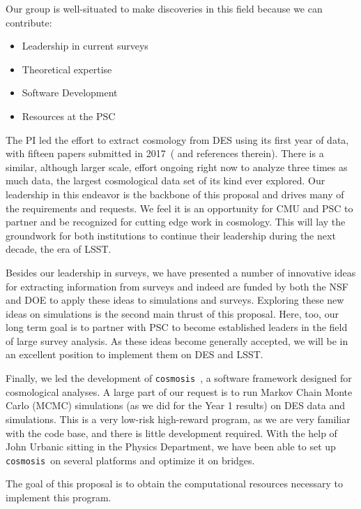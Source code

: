 \documentclass[12pt]{article}
\begin{document}
\begin{small}
Our group is well-situated to make discoveries in this field because we can contribute:
\begin{itemize}
\item Leadership in current surveys
\item Theoretical expertise
\item Software Development
\item Resources at the PSC
\end{itemize} 
The PI led the effort to extract cosmology from DES using its first year of data, with fifteen papers submitted in 2017~(\cite{Abbott:2017wau} and references therein). There is a similar, although larger scale, effort ongoing right now to analyze three times as much data, the largest cosmological data set of its kind ever explored. Our leadership in this endeavor is the backbone of this proposal and drives many of the requirements and requests. We feel it is an opportunity for CMU and PSC to partner and be recognized for cutting edge work in cosmology. This will lay the groundwork for both institutions to continue their leadership during the next decade, the era of LSST.

Besides our leadership in surveys, we have presented a number of innovative ideas for extracting information from surveys and indeed are funded by both the NSF and DOE to apply these ideas to simulations and surveys. Exploring these new ideas on simulations is the second main thrust of this proposal. Here, too, our long term goal is to partner with PSC to become established leaders in the field of large survey analysis. As these ideas become generally accepted, we will be in an excellent position to implement them on DES and LSST.
\newcommand\cosmosis{{\tt cosmosis}}

Finally, we led the development of {\tt cosmosis}~\cite{Zuntz:2014csq}, a software framework designed for cosmological analyses. A large part of our request is to run Markov Chain Monte Carlo (MCMC) simulations (as we did for the Year 1 results) on DES data and simulations. This is a very low-risk high-reward program, as we are very familiar with the code base, and there is little development required. With the help of John Urbanic sitting in the Physics Department, we have been able to set up \cosmosis\ on several platforms and optimize it on bridges.

The goal of this proposal is to obtain the computational resources necessary to implement this program.


\end{small}
\end{document}
